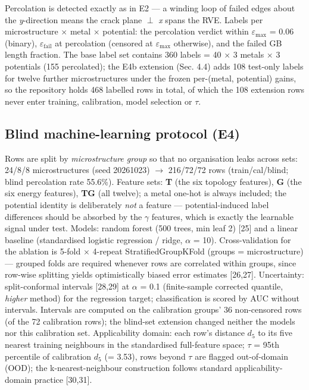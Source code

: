 \documentclass[12pt]{article}
\begin{document}
Percolation is detected exactly as in E2 --- a winding loop of failed edges about the \textit{y}-direction means the crack plane $\perp$ \textit{x} spans the RVE. Labels per microstructure $\times$ metal $\times$ potential: the percolation verdict within $\varepsilon_{\max}$ = 0.06 (binary), $\varepsilon_{\mathrm{fail}}$ at percolation (censored at $\varepsilon_{\max}$ otherwise), and the failed GB length fraction. The base label set contains 360 labels = 40 $\times$ 3 metals $\times$ 3 potentials (155 percolated); the E4b extension (Sec. 4.4) adds 108 test-only labels for twelve further microstructures under the frozen per-(metal, potential) gains, so the repository holds 468 labelled rows in total, of which the 108 extension rows never enter training, calibration, model selection or $\tau$.

\subsection{Blind machine-learning protocol (E4)}

Rows are split by \textit{microstructure group} so that no organisation leaks across sets: 24/8/8 microstructures (seed 20261023) $\rightarrow$ 216/72/72 rows (train/cal/blind; blind percolation rate 55.6\%). Feature sets: \textbf{T} (the six topology features), \textbf{G} (the six energy features), \textbf{TG} (all twelve); a metal one-hot is always included; the potential identity is deliberately \textit{not} a feature --- potential-induced label differences should be absorbed by the $\gamma$ features, which is exactly the learnable signal under test. Models: random forest (500 trees, min leaf 2) [25] and a linear baseline (standardised logistic regression / ridge, $\alpha$ = 10). Cross-validation for the ablation is 5-fold $\times$ 4-repeat StratifiedGroupKFold (groups = microstructure) --- grouped folds are required whenever rows are correlated within groups, since row-wise splitting yields optimistically biased error estimates [26,27]. Uncertainty: split-conformal intervals [28,29] at $\alpha$ = 0.1 (finite-sample corrected quantile, \textit{higher} method) for the regression target; classification is scored by AUC without intervals. Intervals are computed on the calibration groups' 36 non-censored rows (of the 72 calibration rows); the blind-set extension changed neither the models nor this calibration set. Applicability domain: each row's distance $d_5$ to its five nearest training neighbours in the standardised full-feature space; $\tau$ = 95th percentile of calibration $d_5$ (= 3.53), rows beyond $\tau$ are flagged out-of-domain (OOD); the k-nearest-neighbour construction follows standard applicability-domain practice [30,31].
\end{document}
